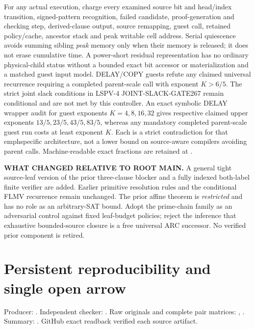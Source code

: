 \documentclass[11pt]{article}
\begin{document}
For any actual execution, charge every examined source bit and
head/index transition, signed-pattern recognition, failed candidate,
proof-generation and checking step, derived-clause output, source
remapping, guest call, retained policy/cache, ancestor stack and peak
writable cell address. Serial quiescence avoids summing sibling
\emph{peak} memory only when their memory is released; it does not
erase cumulative time. A power-short residual representation has
no ordinary physical-child status without a bounded exact
bit accessor or materialization and a matched guest input model.
DELAY/COPY guests refute any claimed universal recurrence
requiring a completed parent-scale call with exponent $K>6/5$.
The strict joint slack conditions in LSPV-4 JOINT-SLACK-GATE267
remain conditional and are not met by this controller.
An exact symbolic DELAY wrapper audit for guest exponents
$K=4,8,16,32$ gives respective claimed upper exponents
$13/5,23/5,43/5,83/5$, whereas any mandatory completed
parent-scale guest run costs at least exponent $K$. Each is a
strict contradiction for that emph{specific} architecture, not a
lower bound on source-aware compilers avoiding parent calls.
Machine-readable exact fractions are retained at
.

\noindent\textbf{WHAT CHANGED RELATIVE TO ROOT MAIN.}
A general tight source-leaf version of the prior three-clause
blocker and a fully indexed both-label finite verifier are added.
Earlier primitive resolution rules and the conditional FLMV
recurrence remain unchanged. The prior affine theorem is
\emph{restricted} and has no role as an arbitrary-SAT bound.
Adopt the prime-chain family as an adversarial control against
fixed leaf-budget policies; reject the inference that exhaustive
bounded-source closure is a free universal ARC successor.
No verified prior component is retired.

\section{Persistent reproducibility and single open arrow}
\noindent Producer:
.
Independent checker:
.
Raw originals and complete pair matrices:
,
.
Summary:
.
GitHub exact readback verified each source artifact.
\end{document}
